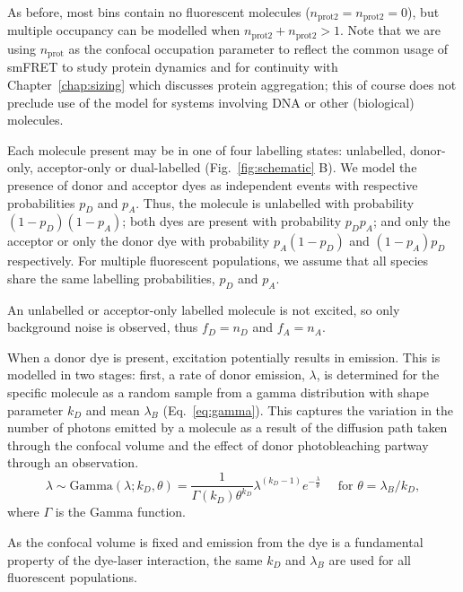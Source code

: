 As before, most bins contain no fluorescent molecules ($n_{\text{prot2}} = n_{\text{prot2}} = 0$), but multiple occupancy can be modelled when $n_{\text{prot2}} + n_{\text{prot2}} >1$. Note that we are using $n_{\text{prot}}$ as the confocal occupation parameter to reflect the common usage of smFRET to study protein dynamics and for continuity with Chapter~\ref{chap:sizing} which discusses protein aggregation; this of course does not preclude use of the model for systems involving DNA or other (biological) molecules.

Each molecule present may be in one of four labelling states: unlabelled, donor-only, acceptor-only or dual-labelled (Fig.~\ref{fig:schematic} B). We model the presence of donor and acceptor dyes as independent events with respective probabilities $p_D$ and $p_A$. Thus, the molecule is unlabelled with probability $(1-p_D)(1-p_A)$; both dyes are present with probability $p_D p_A$; and only the acceptor or only the donor dye with probability $p_A (1-p_D)$ and $(1-p_A)p_D$ respectively. For multiple fluorescent populations, we assume that all species share the same labelling probabilities, $p_D$ and $p_A$. 

An unlabelled or acceptor-only labelled molecule is not excited, so only background noise is observed, thus $f_D = n_D$ and $f_A = n_A$.

When a donor dye is present, excitation potentially results in emission. This is modelled in two stages: first, a rate of donor emission, $\lambda$, is determined for the specific molecule as a random sample from a gamma distribution with shape parameter $k_D$ and mean $\lambda_B$ (Eq.~\ref{eq:gamma}). This captures the variation in the number of photons emitted by a molecule as a result of the diffusion path taken through the confocal volume and the effect of donor photobleaching partway through an observation.
\begin{equation}
\lambda \sim \text{Gamma}(\lambda; k_D, \theta) =  \frac{1}{\Gamma(k_D) \theta^{k_D}} \lambda^{(k_D - 1)} e^{-\frac{\lambda}{\theta}} \quad\text{ for } \theta = \lambda_B / k_D ,
\label{eq:gamma}
\end{equation} 
where $\Gamma$ is the Gamma function. 

As the confocal volume is fixed and emission from the dye is a fundamental property of the dye-laser interaction, the same $k_D$ and $\lambda_B$ are used for all fluorescent populations. 

